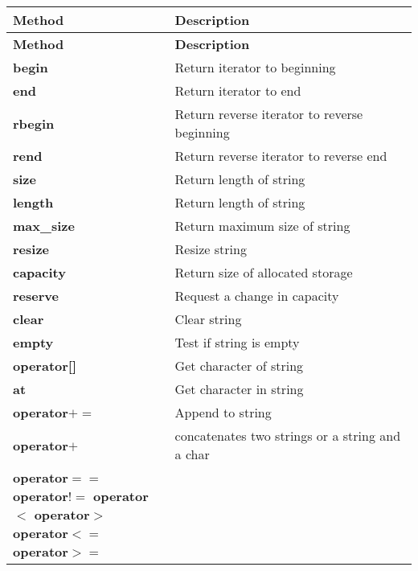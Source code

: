 \documentclass[main]{subfiles}
\begin{document}
\scriptsize
\begin{longtable}{p{0.4\linewidth} p{0.6\linewidth}}
\hline \textbf{Method} & \textbf{Description}\\ \hline
\endfirsthead

\hline \textbf{Method} & \textbf{Description}\\ \hline\hline
\endhead

\textbf{begin} &
Return iterator to beginning\\

\textbf{end} &
Return iterator to end\\

\textbf{rbegin} &
Return reverse iterator to reverse beginning\\

\textbf{rend} &
Return reverse iterator to reverse end\\

\textbf{size} &
Return length of string\\

\textbf{length} &
Return length of string\\

\textbf{max\_size} &
Return maximum size of string\\

\textbf{resize} &
Resize string\\

\textbf{capacity} &
Return size of allocated storage\\

\textbf{reserve} &
Request a change in capacity\\

\textbf{clear} &
Clear string\\

\textbf{empty} &
Test if string is empty\\

\textbf{operator[]} &
Get character of string\\

\textbf{at} &
Get character in string\\

\textbf{operator$+=$} 
& Append to string\\

\textbf{operator$+$}  
& concatenates two strings or a string and a char \\

\textbf{operator$==$}\newline
\textbf{operator$!=$}\newline
\textbf{operator$<$}\newline
\textbf{operator$>$}\newline
\textbf{operator$<=$}\newline
\textbf{operator$>=$} & 
 

\end{longtable}
\end{document}
